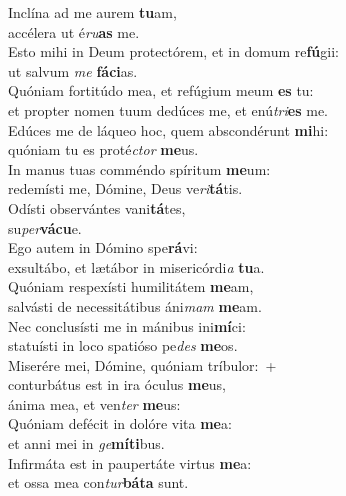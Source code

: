 \evenverse Inclína ad me aurem \textbf{tu}am,~\*\\
\evenverse accélera ut é\textit{ru}\textbf{as} me.\\
\oddverse Esto mihi in Deum protectórem, et in domum re\textbf{fú}gii:~\*\\
\oddverse ut salvum \textit{me} \textbf{fá}\textbf{ci}as.\\
\evenverse Quóniam fortitúdo mea, et refúgium meum \textbf{es} tu:~\*\\
\evenverse et propter nomen tuum dedúces me, et enú\textit{tri}\textbf{es} me.\\
\oddverse Edúces me de láqueo hoc, quem abscondérunt \textbf{mi}hi:~\*\\
\oddverse quóniam tu es proté\textit{ctor} \textbf{me}us.\\
\evenverse In manus tuas comméndo spíritum \textbf{me}um:~\*\\
\evenverse redemísti me, Dómine, Deus ve\textit{ri}\textbf{tá}tis.\\
\oddverse Odísti observántes vani\textbf{tá}tes,~\*\\
\oddverse su\textit{per}\textbf{vá}\textbf{cu}e.\\
\evenverse Ego autem in Dómino spe\textbf{rá}vi:~\*\\
\evenverse exsultábo, et lætábor in misericórdi\textit{a} \textbf{tu}a.\\
\oddverse Quóniam respexísti humilitátem \textbf{me}am,~\*\\
\oddverse salvásti de necessitátibus áni\textit{mam} \textbf{me}am.\\
\evenverse Nec conclusísti me in mánibus ini\textbf{mí}ci:~\*\\
\evenverse statuísti in loco spatióso pe\textit{des} \textbf{me}os.\\
\oddverse Miserére mei, Dómine, quóniam tríbulor:~+\\
\oddverse  conturbátus est in ira óculus \textbf{me}us,~\*\\
\oddverse ánima mea, et ven\textit{ter} \textbf{me}us:\\
\evenverse Quóniam defécit in dolóre vita \textbf{me}a:~\*\\
\evenverse et anni mei in \textit{ge}\textbf{mí}\textbf{ti}bus.\\
\oddverse Infirmáta est in paupertáte virtus \textbf{me}a:~\*\\
\oddverse et ossa mea con\textit{tur}\textbf{bá}\textbf{ta} sunt.\\
